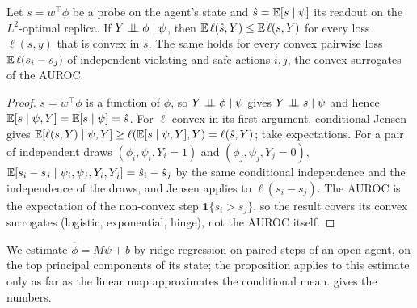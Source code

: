 \begin{proposition}\label{prop:rb}
Let $s=w^\top\phi$ be a probe on the agent's state and $\hat s=\mathbb{E}[s\mid\psi]$ its readout on the $L^2$-optimal replica. If $Y\perp\!\!\!\perp\phi\mid\psi$, then $\mathbb{E}\,\ell(\hat s,Y)\le\mathbb{E}\,\ell(s,Y)$ for every loss $\ell(s,y)$ that is convex in $s$. The same holds for every convex pairwise loss $\mathbb{E}\,\ell(s_i-s_j)$ of independent violating and safe actions $i,j$, the convex surrogates of the AUROC.
\end{proposition}
\begin{proof}
$s=w^\top\phi$ is a function of $\phi$, so $Y\perp\!\!\!\perp\phi\mid\psi$
gives $Y\perp\!\!\!\perp s\mid\psi$ and hence $\mathbb{E}[s\mid\psi,Y]=\mathbb{E}[s\mid\psi]=\hat s$. For $\ell$ convex in its first argument, conditional
Jensen gives $\mathbb{E}[\ell(s,Y)\mid\psi,Y]\ge\ell(\mathbb{E}[s\mid\psi,Y],Y)=\ell(\hat s,Y)$; take expectations. For a pair of independent
draws $(\phi_i,\psi_i,Y_i=1)$ and $(\phi_j,\psi_j,Y_j=0)$, $\mathbb{E}[s_i-s_j\mid\psi_i,\psi_j,Y_i,Y_j]=\hat s_i-\hat s_j$ by the same
conditional independence and the independence of the draws, and Jensen applies to $\ell(s_i-s_j)$. The AUROC is the expectation
of the non-convex step $\mathbf 1\{s_i>s_j\}$, so the result covers its convex surrogates (logistic, exponential, hinge), not the
AUROC itself.
\end{proof}
We estimate $\hat\phi=M\psi+b$ by ridge regression on paired steps of an open agent, on the top principal components of its state; the proposition applies to this estimate only as far as the linear map approximates the conditional mean.  gives the numbers.


